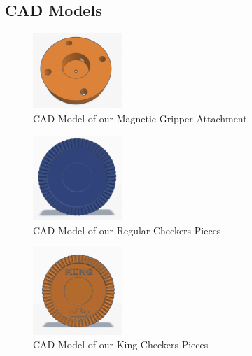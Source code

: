 \subsection{CAD Models}
\begin{figure}[h!]
	\centering
 	\includegraphics[width=0.30\textwidth]{images/Gripper Attachment.png}
 \caption{CAD Model of our Magnetic Gripper Attachment}
\end{figure}
\begin{figure}[h!]
	\centering
 	\includegraphics[width=0.30\textwidth]{images/Checkers Piece.png}
 \caption{CAD Model of our Regular Checkers Pieces}
\end{figure}
\begin{figure}[h!]
	\centering
 	\includegraphics[width=0.30\textwidth]{images/King Piece.png}
 \caption{CAD Model of our King Checkers Pieces}
\end{figure}

